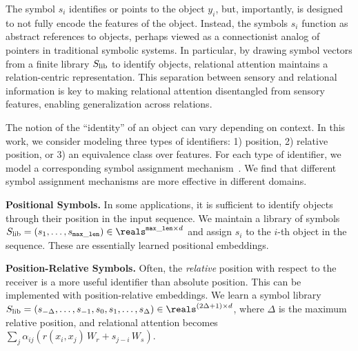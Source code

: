 The symbol $s_i$ identifies or points to the object $y_i$, but, importantly, is designed to not fully encode the features of the object.
Instead, the symbols $s_i$ function as abstract references to objects, perhaps viewed as a connectionist analog of pointers in traditional symbolic systems.
In particular, by drawing symbol vectors from a finite library $S_\mathrm{lib}$ to identify objects, relational attention maintains a relation-centric representation.
This separation between sensory and relational information is key to making relational attention disentangled from sensory features, enabling generalization across relations.

The notion of the ``identity'' of an object can vary depending on context. In this work, we consider modeling three types of identifiers: 1) position, 2) relative position, or 3) an equivalence class over features. For each type of identifier, we model a corresponding symbol assignment mechanism~\citep{altabaa2024abstractors}. We find that different symbol assignment mechanisms are more effective in different domains.

\textbf{Positional Symbols.} In some applications, it is sufficient to identify objects through their position in the input sequence. We maintain a library of symbols $\Slib = (s_1, \ldots, s_{\mathtt{max\_len}}) \in \reals^{\mathtt{max\_len} \times d}$ and assign $s_i$ to the $i$-th object in the sequence. These are essentially learned positional embeddings.

\textbf{Position-Relative Symbols.} Often, the \textit{relative} position with respect to the receiver is a more useful identifier than absolute position. This can be implemented with position-relative embeddings. We learn a symbol library $\Slib = (s_{-\Delta}, \ldots, s_{-1}, s_0, s_1, \ldots, s_{\Delta}) \in \reals^{(2 \Delta + 1) \times d}$, where $\Delta$ is the maximum relative position, and relational attention becomes $\sum_{j} \alpha_{ij}  (r(x_i, x_j) \, W_r + s_{j-i} \,  W_s)$.

